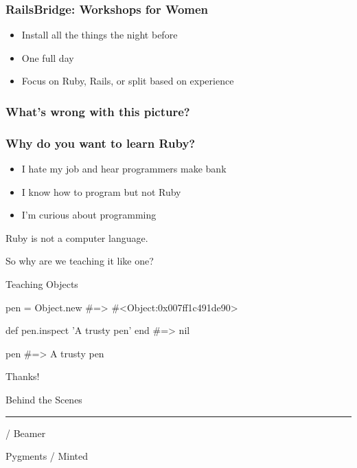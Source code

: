 \documentclass[20pt]{beamer}
\begin{document}
\begin{frame}
	\frametitle{RailsBridge: Workshops for Women}
	\begin{itemize}
		\item Install all the things the night before
		\item One full day
		\item Focus on Ruby, Rails, or split based on experience
	\end{itemize}
\end{frame}

\begin{frame}
	\frametitle{What's wrong with this picture?}

\end{frame}

\begin{frame}
	\frametitle{Why do you want to learn Ruby?}

	\begin{itemize}
		\item I hate my job and hear programmers make bank
		\item I know how to program but not Ruby
		\item I'm curious about programming
	\end{itemize}
\end{frame}


\begin{frame}
	\par {Ruby is not a computer language.}
	\vspace{4cm}\pause
	\par {So why are we teaching it like one?}
\end{frame}

\begin{frame}
	\par{ Teaching Objects}
	\par\vspace{3cm}
\end{frame}

\begin{frame}[fragile]
	\begin{rubycode}
pen = Object.new
#=> #<Object:0x007ff1c491de90>

def pen.inspect
'A trusty pen'
end
#=> nil

pen
#=> A trusty pen
	\end{rubycode}
\end{frame}

\begin{frame}
\end{frame}


\begin{frame}
	\begin{center}
		\vspace{2.5cm}
		{Thanks!}
		\vspace{1.5cm}

		Behind the Scenes
		\par\rule[3mm]{3cm}{0.1mm}

		\XeLaTeX / Beamer

		Pygments / Minted
	\end{center}
\end{frame}
\end{document}
